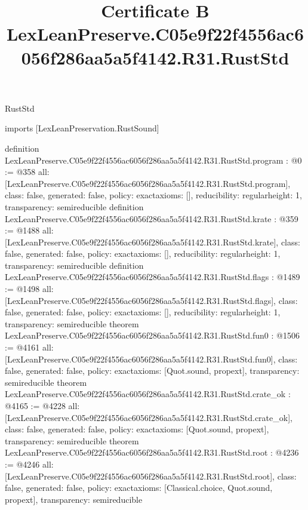 \begin{lexlean}{RustStd}
\title{Certificate B LexLeanPreserve.C05e9f22f4556ac6056f286aa5a5f4142.R31.RustStd}
\begin{coremodule}
imports [LexLeanPreservation.RustSound]

definition LexLeanPreserve.C05e9f22f4556ac6056f286aa5a5f4142.R31.RustStd.program : @0 := @358 {
  all: [LexLeanPreserve.C05e9f22f4556ac6056f286aa5a5f4142.R31.RustStd.program],
  class: false,
  generated: false,
  policy: exact{axioms: []},
  reducibility: regular{height: 1},
  transparency: semireducible
}
definition LexLeanPreserve.C05e9f22f4556ac6056f286aa5a5f4142.R31.RustStd.krate : @359 := @1488 {
  all: [LexLeanPreserve.C05e9f22f4556ac6056f286aa5a5f4142.R31.RustStd.krate],
  class: false,
  generated: false,
  policy: exact{axioms: []},
  reducibility: regular{height: 1},
  transparency: semireducible
}
definition LexLeanPreserve.C05e9f22f4556ac6056f286aa5a5f4142.R31.RustStd.flags : @1489 := @1498 {
  all: [LexLeanPreserve.C05e9f22f4556ac6056f286aa5a5f4142.R31.RustStd.flags],
  class: false,
  generated: false,
  policy: exact{axioms: []},
  reducibility: regular{height: 1},
  transparency: semireducible
}
theorem LexLeanPreserve.C05e9f22f4556ac6056f286aa5a5f4142.R31.RustStd.fun0 : @1506 := @4161 {
  all: [LexLeanPreserve.C05e9f22f4556ac6056f286aa5a5f4142.R31.RustStd.fun0],
  class: false,
  generated: false,
  policy: exact{axioms: [Quot.sound, propext]},
  transparency: semireducible
}
theorem LexLeanPreserve.C05e9f22f4556ac6056f286aa5a5f4142.R31.RustStd.crate_ok : @4165 := @4228 {
  all: [LexLeanPreserve.C05e9f22f4556ac6056f286aa5a5f4142.R31.RustStd.crate_ok],
  class: false,
  generated: false,
  policy: exact{axioms: [Quot.sound, propext]},
  transparency: semireducible
}
theorem LexLeanPreserve.C05e9f22f4556ac6056f286aa5a5f4142.R31.RustStd.root : @4236 := @4246 {
  all: [LexLeanPreserve.C05e9f22f4556ac6056f286aa5a5f4142.R31.RustStd.root],
  class: false,
  generated: false,
  policy: exact{axioms: [Classical.choice, Quot.sound, propext]},
  transparency: semireducible
}


\end{coremodule}
\end{lexlean}
